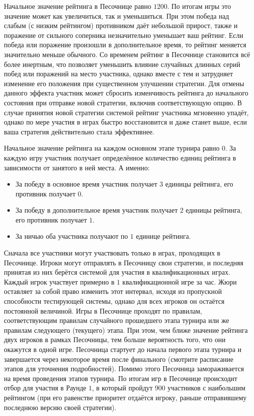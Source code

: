Начальное значение рейтинга в Песочнице равно $1200$. По итогам игры это значение может как увеличиться, так и уменьшиться. При этом победа
над слабым (с низким рейтингом) противником даёт небольшой прирост, также и поражение от сильного соперника незначительно уменьшает ваш
рейтинг. Если победа или поражение произошли в дополнительное время, то рейтинг меняется значительно меньше обычного. Со временем рейтинг в
Песочнице становится всё более инертным, что позволяет уменьшить влияние случайных длинных серий побед или поражений на место участника,
однако вместе с тем и затрудняет изменение его положения при существенном улучшении стратегии. Для отмены данного эффекта участник может
сбросить изменчивость рейтинга до начального состояния при отправке новой стратегии, включив соответствующую опцию. В случае принятия новой
стратегии системой рейтинг участника мгновенно упадёт, однако по мере участия в играх быстро восстановится и даже станет выше, если ваша
стратегия действительно стала эффективнее.

Начальное значение рейтинга на каждом основном этапе турнира равно $0$. За каждую игру участник получает определённое количество единиц
рейтинга в зависимости от занятого в ней места. А именно:
\begin{itemize}
\item За победу в основное время участник получает $3$ единицы рейтинга, его противник получает $0$.
\item За победу в дополнительное время участник получает $2$ единицы рейтинга, его противник получает $1$.
\item За ничью оба участника получают по $1$ единице рейтинга.
\end{itemize}

Сначала все участники могут участвовать только в играх, проходящих в Песочнице. Игроки могут отправлять в Песочницу свои стратегии, и
последняя принятая из них берётся системой для участия в квалификационных играх. Каждый игрок участвует примерно в $1$ квалификационной игре
за час. Жюри оставляет за собой право изменить этот интервал, исходя из пропускной способности тестирующей системы, однако для всех игроков
он остаётся постоянной величиной. Игры в Песочнице проходят по правилам, соответствующим правилам случайного прошедшего этапа турнира или же
правилам следующего (текущего) этапа. При этом, чем ближе значение рейтинга двух игроков в рамках Песочницы, тем больше вероятность того,
что они окажутся в одной игре. Песочница стартует до начала первого этапа турнира и завершается через некоторое время после финального
(смотрите расписание этапов для уточнения подробностей). Помимо этого Песочница замораживается на время проведения этапов турнира. По итогам
игр в Песочнице происходит отбор для участия в Раунде $1$, в который пройдут $900$ участников с наибольшим рейтингом (при его равенстве
приоритет отдаётся игроку, раньше отправившему последнюю версию своей стратегии).

